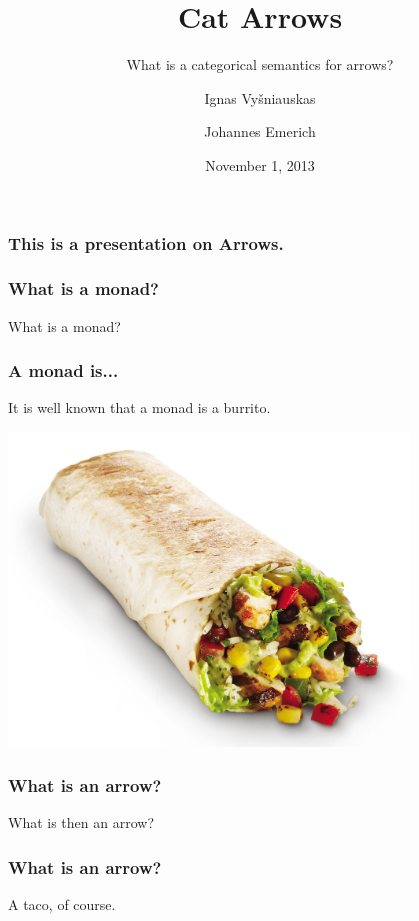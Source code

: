 \documentclass{beamer}
\title{Cat Arrows}
\subtitle{What is a categorical semantics for arrows?}
\author[Vyšniauskas, Emerich]
{Ignas Vyšniauskas \and Johannes Emerich}
\institute{
  ILLC \\
  Universiteit van Amsterdam
}
\date{November 1, 2013}
\begin{document}
\frame{\titlepage}

\begin{frame}
    \frametitle{This is a presentation on Arrows.}

\end{frame}

\begin{frame}
    \frametitle{What is a monad?}

    \begin{center}What is a monad?\end{center}

\end{frame}

\begin{frame}
    \frametitle{A monad is...}

    \center It is well known that a monad is a burrito.

    \includegraphics[width=0.8\textwidth]{img/burrito.jpg}

\end{frame}

\begin{frame}
    \frametitle{What is an arrow?}

    \begin{center}What is then an arrow?\end{center}

\end{frame}


\begin{frame}
    \frametitle{What is an arrow?}
    \center
    A taco, of course.

\end{frame}
\end{document}
